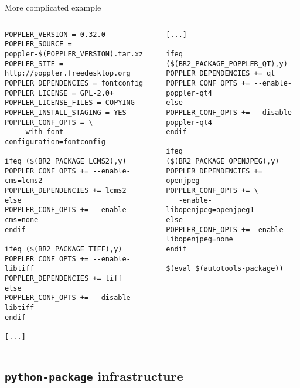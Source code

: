 \begin{frame}[fragile]{More complicated  example}
  \begin{columns}
    \begin{block}{}
      \begin{verbatim}
POPPLER_VERSION = 0.32.0
POPPLER_SOURCE = poppler-$(POPPLER_VERSION).tar.xz
POPPLER_SITE = http://poppler.freedesktop.org
POPPLER_DEPENDENCIES = fontconfig
POPPLER_LICENSE = GPL-2.0+
POPPLER_LICENSE_FILES = COPYING
POPPLER_INSTALL_STAGING = YES
POPPLER_CONF_OPTS = \
   --with-font-configuration=fontconfig

ifeq ($(BR2_PACKAGE_LCMS2),y)
POPPLER_CONF_OPTS += --enable-cms=lcms2
POPPLER_DEPENDENCIES += lcms2
else
POPPLER_CONF_OPTS += --enable-cms=none
endif

ifeq ($(BR2_PACKAGE_TIFF),y)
POPPLER_CONF_OPTS += --enable-libtiff
POPPLER_DEPENDENCIES += tiff
else
POPPLER_CONF_OPTS += --disable-libtiff
endif

[...]
\end{verbatim}
\end{block}
    \begin{block}{}
      \begin{verbatim}
[...]

ifeq ($(BR2_PACKAGE_POPPLER_QT),y)
POPPLER_DEPENDENCIES += qt
POPPLER_CONF_OPTS += --enable-poppler-qt4
else
POPPLER_CONF_OPTS += --disable-poppler-qt4
endif

ifeq ($(BR2_PACKAGE_OPENJPEG),y)
POPPLER_DEPENDENCIES += openjpeg
POPPLER_CONF_OPTS += \
   -enable-libopenjpeg=openjpeg1
else
POPPLER_CONF_OPTS += -enable-libopenjpeg=none
endif

$(eval $(autotools-package))
      \end{verbatim}
    \end{block}
  \end{columns}
\end{frame}

\subsection{{\tt python-package} infrastructure}

